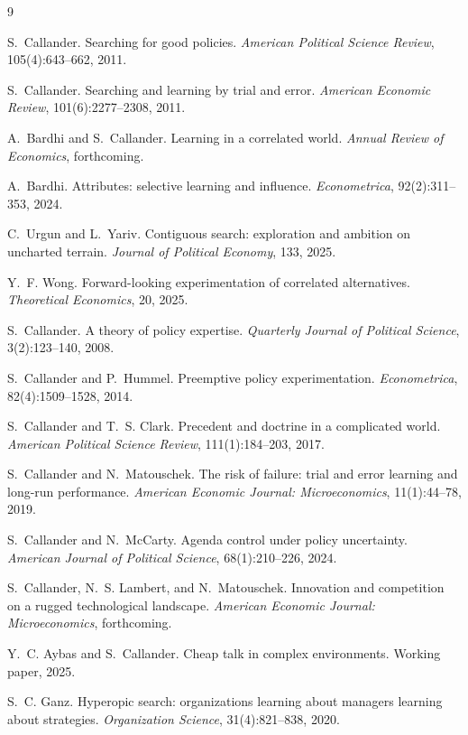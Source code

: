 \documentclass[11pt]{article}
\theoremstyle{itheads}
\begin{document}
\begin{thebibliography}{9}

S.~Callander.
Searching for good policies.
\emph{American Political Science Review}, 105(4):643--662, 2011.

S.~Callander.
Searching and learning by trial and error.
\emph{American Economic Review}, 101(6):2277--2308, 2011.

A.~Bardhi and S.~Callander.
Learning in a correlated world.
\emph{Annual Review of Economics}, forthcoming.

A.~Bardhi.
Attributes: selective learning and influence.
\emph{Econometrica}, 92(2):311--353, 2024.

C.~Urgun and L.~Yariv.
Contiguous search: exploration and ambition on uncharted terrain.
\emph{Journal of Political Economy}, 133, 2025.

Y.~F. Wong.
Forward-looking experimentation of correlated alternatives.
\emph{Theoretical Economics}, 20, 2025.

S.~Callander.
A theory of policy expertise.
\emph{Quarterly Journal of Political Science}, 3(2):123--140, 2008.

S.~Callander and P.~Hummel.
Preemptive policy experimentation.
\emph{Econometrica}, 82(4):1509--1528, 2014.

S.~Callander and T.~S. Clark.
Precedent and doctrine in a complicated world.
\emph{American Political Science Review}, 111(1):184--203, 2017.

S.~Callander and N.~Matouschek.
The risk of failure: trial and error learning and long-run
performance.
\emph{American Economic Journal: Microeconomics}, 11(1):44--78, 2019.

S.~Callander and N.~McCarty.
Agenda control under policy uncertainty.
\emph{American Journal of Political Science}, 68(1):210--226, 2024.

S.~Callander, N.~S. Lambert, and N.~Matouschek.
Innovation and competition on a rugged technological landscape.
\emph{American Economic Journal: Microeconomics}, forthcoming.

Y.~C. Aybas and S.~Callander.
Cheap talk in complex environments.
Working paper, 2025.

S.~C. Ganz.
Hyperopic search: organizations learning about managers learning
about strategies.
\emph{Organization Science}, 31(4):821--838, 2020.


\end{thebibliography}
\end{document}
